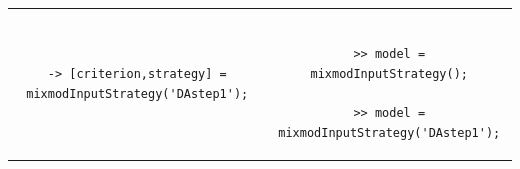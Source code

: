 \begin{itemize}
\begin{tabular}{c|c}
\begin{minipage}[c]{0.55\columnwidth}
{\begin{verbatim}
-> [criterion,strategy] = mixmodInputStrategy('DAstep1');
\end{verbatim}}
\end{minipage}%
&
\begin{minipage}[c]{0.45\columnwidth}%
{\scriptsize
\begin{verbatim}

>> model = mixmodInputStrategy();

>> model = mixmodInputStrategy('DAstep1');
\end{verbatim}}
\end{minipage}%
\end{tabular}\\


\end{itemize}













